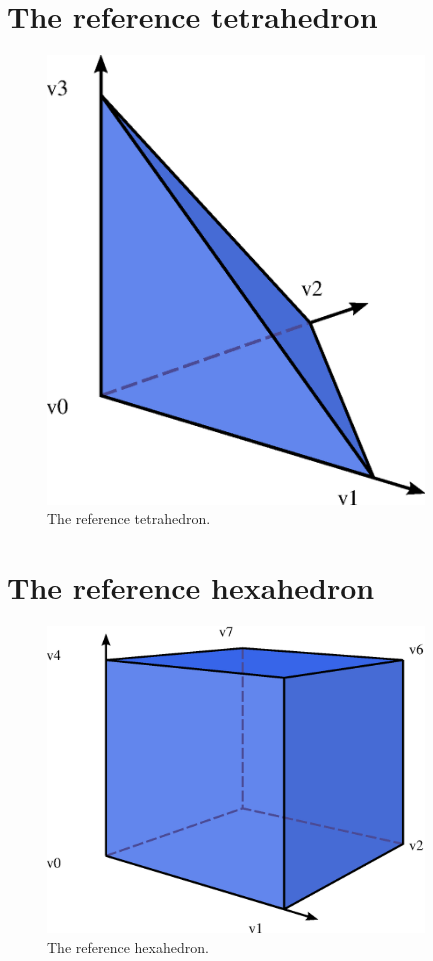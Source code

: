 \newpage
\section{The reference tetrahedron}

\begin{figure}[H]
  \begin{center}
    \includegraphics[width=10cm]{eps/tetrahedron.eps}
    \caption{The reference tetrahedron.}
  \end{center}
\end{figure}

\newpage
\section{The reference hexahedron}

\begin{figure}[H]
  \begin{center}
    \includegraphics[width=10cm]{eps/hexahedron.eps}
    \caption{The reference hexahedron.}
  \end{center}
\end{figure}

